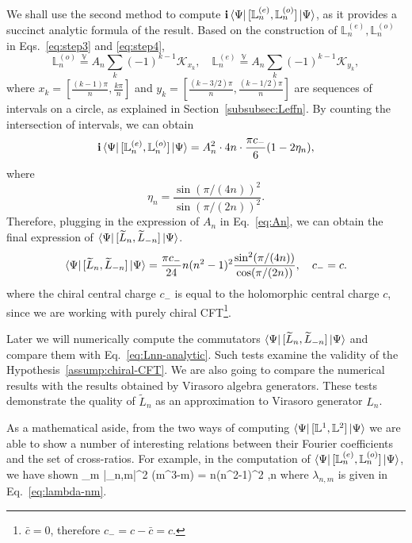 \documentclass[12pt, nofootinbib]{article}
\theoremstyle{plain}
\theoremstyle{assumption}
\theoremstyle{definition}
\theoremstyle{plain}
\theoremstyle{plain}
\theoremstyle{plain}
\theoremstyle{plain}
\theoremstyle{plain}
\newcommand{\JM}[1]{{\color{JMblue}\footnotesize{(JM) #1}}}
\newcommand{\XL}[1]{{\color{XLgreen}\footnotesize{(XL) #1}}}
\def\veq{\stackrel{\mathbb{V}}{=}}
\def\Lb{\mathbb{L}}
\def\Lbe{\mathbb{L}^{(e)}}
\def\Lbo{\mathbb{L}^{(o)}}
\def\Leff{\widetilde{L}}
\def\Kcft{\mathscr{K}}
\begin{document}
We shall use the second method to compute $\ii \bra{\Psi} [\Lbe_n,\Lbo_{n}]\ket{\Psi}$, as it provides a succinct analytic formula of the result. Based on the construction of $\Lbe_n,\Lbo_n$ in Eqs.~\eqref{eq:step3} and \eqref{eq:step4},
\begin{equation}
    \Lbo_n \veq A_n\sum_k (-1)^{k-1} \Kcft_{x_k},\quad \Lbe_n \veq A_n\sum_k (-1)^{k-1} \Kcft_{y_k},
\end{equation}
where $x_k = \left[ \frac{(k-1)\pi}{n}, \frac{k\pi}{n} \right]$ and $y_k = \left[ \frac{(k-3/2)\pi}{n}, \frac{(k-1/2)\pi}{n} \right]$ are sequences of intervals on a circle, as explained in Section~\ref{subsubsec:Leffn}. By counting the intersection of intervals, we can obtain
\begin{equation}
    \ii \bra{\Psi} [\Lbe_n,\Lbo_{n}]\ket{\Psi} = A_n^2\cdot 4n\cdot \frac{\pi c_{-}}{6}(1-2\eta_n), 
\end{equation}
where 
\begin{equation}
    \eta_n = \frac{\sin(\pi/(4n))^2}{\sin(\pi/(2n))^2}. 
\end{equation}
Therefore, plugging in the expression of $A_n$ in Eq.~\eqref{eq:An}, we can obtain the final expression of $\bra{\Psi} [\Leff_n,\Leff_{-n}]\ket{\Psi}$. 
\begin{equation}\label{eq:Lnn-analytic}
    \bra{\Psi} [\Leff_n,\Leff_{-n}]\ket{\Psi} = \frac{\pi c_{-}}{24} n(n^2-1)^2 \frac{\sin^2(\pi/(4n))}{\cos(\pi/(2n))}, \quad c_{-} = c. 
\end{equation}
where the chiral central charge $c_{-}$ is equal to the holomorphic central charge $c$, since we are working with purely chiral CFT\footnote{$\bar{c}=0$, therefore $c_{-} = c-\bar{c} = c$.}. 

Later we will numerically compute the commutators $\bra{\Psi} [\Leff_n,\Leff_{-n}]\ket{\Psi}$ and compare them with Eq.~\eqref{eq:Lnn-analytic}. Such tests examine the validity of the Hypothesis~\ref{assump:chiral-CFT}. We are also going to compare the numerical results with the results obtained by Virasoro algebra generators. These tests demonstrate the quality of $\Leff_n$ as an approximation to Virasoro generator $L_n$. 


As a mathematical aside, from the two ways of computing $\bra{\Psi}[\Lb^1,\Lb^2]\ket{\Psi}$ we are able to show a number of interesting relations between their Fourier coefficients and the set of cross-ratios. For example, in the computation of $\bra{\Psi}[\Lbe_n,\Lbo_{n}]\ket{\Psi}$, we have shown 
\be 
\sum_{m\in{}} |\lambda_{n,m}|^2 (m^3-m) =  n(n^2-1)^2 ,\quad n
\ee
where $\lambda_{n,m}$ is given in Eq.~\eqref{eq:lambda-nm}. 
\end{document}
